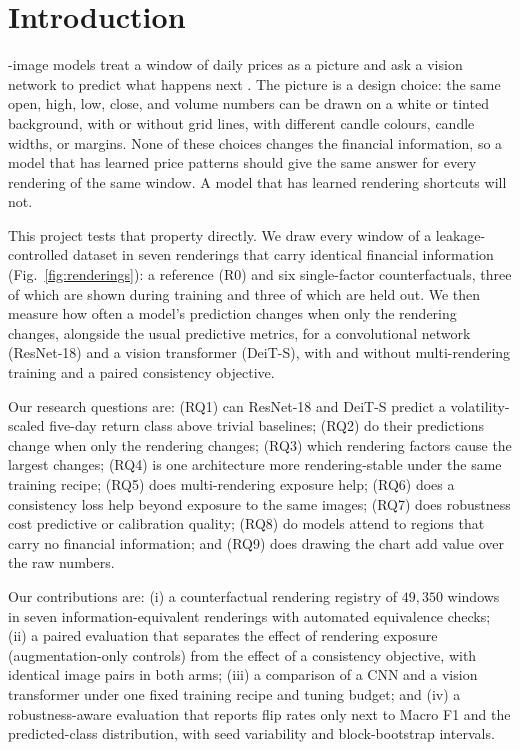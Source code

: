 \documentclass[10pt,journal,compsoc]{IEEEtran}
\begin{document}
\maketitle
\IEEEdisplaynontitleabstractindextext
\IEEEpeerreviewmaketitle

\section{Introduction}\label{sec:intro}
-image models treat a window of daily prices as a picture and ask a vision network to predict what happens next \cite{jiang2023reimagining, sezer2018cnnta}. The picture is a design choice: the same open, high, low, close, and volume numbers can be drawn on a white or tinted background, with or without grid lines, with different candle colours, candle widths, or margins. None of these choices changes the financial information, so a model that has learned price patterns should give the same answer for every rendering of the same window. A model that has learned rendering shortcuts \cite{geirhos2020shortcut} will not.

This project tests that property directly. We draw every window of a leakage-controlled dataset in seven renderings that carry identical financial information (Fig.~\ref{fig:renderings}): a reference (R0) and six single-factor counterfactuals, three of which are shown during training and three of which are held out. We then measure how often a model's prediction changes when only the rendering changes, alongside the usual predictive metrics, for a convolutional network (ResNet-18) and a vision transformer (DeiT-S), with and without multi-rendering training and a paired consistency objective.

Our research questions are: (RQ1) can ResNet-18 and DeiT-S predict a volatility-scaled five-day return class above trivial baselines; (RQ2) do their predictions change when only the rendering changes; (RQ3) which rendering factors cause the largest changes; (RQ4) is one architecture more rendering-stable under the same training recipe; (RQ5) does multi-rendering exposure help; (RQ6) does a consistency loss help beyond exposure to the same images; (RQ7) does robustness cost predictive or calibration quality; (RQ8) do models attend to regions that carry no financial information; and (RQ9) does drawing the chart add value over the raw numbers.

Our contributions are: (i) a counterfactual rendering registry of $49{,}350$ windows in seven information-equivalent renderings with automated equivalence checks; (ii) a paired evaluation that separates the effect of rendering exposure (augmentation-only controls) from the effect of a consistency objective, with identical image pairs in both arms; (iii) a comparison of a CNN and a vision transformer under one fixed training recipe and tuning budget; and (iv) a robustness-aware evaluation that reports flip rates only next to Macro F1 and the predicted-class distribution, with seed variability and block-bootstrap intervals.
\end{document}
